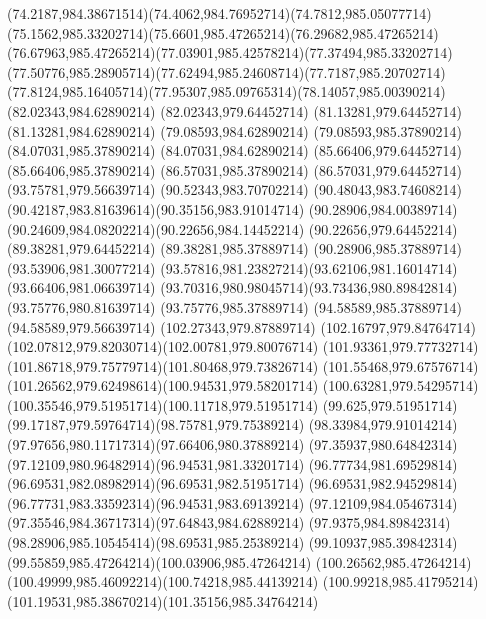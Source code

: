 {{	\curveto(74.2187,984.38671514)(74.4062,984.76952714)(74.7812,985.05077714)
	\curveto(75.1562,985.33202714)(75.6601,985.47265214)(76.29682,985.47265214)
	\curveto(76.67963,985.47265214)(77.03901,985.42578214)(77.37494,985.33202714)
	\curveto(77.50776,985.28905714)(77.62494,985.24608714)(77.7187,985.20702714)
	\curveto(77.8124,985.16405714)(77.95307,985.09765314)(78.14057,985.00390214)
	\closepath
	\moveto(82.02343,984.62890214)
	\lineto(82.02343,979.64452714)
	\lineto(81.13281,979.64452714)
	\lineto(81.13281,984.62890214)
	\lineto(79.08593,984.62890214)
	\lineto(79.08593,985.37890214)
	\lineto(84.07031,985.37890214)
	\lineto(84.07031,984.62890214)
	\closepath
	\moveto(85.66406,979.64452714)
	\lineto(85.66406,985.37890214)
	\lineto(86.57031,985.37890214)
	\lineto(86.57031,979.64452714)
	\closepath
	\moveto(93.75781,979.56639714)
	\lineto(90.52343,983.70702214)
	\curveto(90.48043,983.74608214)(90.42187,983.81639614)(90.35156,983.91014714)
	\curveto(90.28906,984.00389714)(90.24609,984.08202214)(90.22656,984.14452214)
	\lineto(90.22656,979.64452214)
	\lineto(89.38281,979.64452214)
	\lineto(89.38281,985.37889714)
	\lineto(90.28906,985.37889714)
	\lineto(93.53906,981.30077214)
	\curveto(93.57816,981.23827214)(93.62106,981.16014714)(93.66406,981.06639714)
	\curveto(93.70316,980.98045714)(93.73436,980.89842814)(93.75776,980.81639714)
	\lineto(93.75776,985.37889714)
	\lineto(94.58589,985.37889714)
	\lineto(94.58589,979.56639714)
	\closepath
	\moveto(102.27343,979.87889714)
	\curveto(102.16797,979.84764714)(102.07812,979.82030714)(102.00781,979.80076714)
	\curveto(101.93361,979.77732714)(101.86718,979.75779714)(101.80468,979.73826714)
	\curveto(101.55468,979.67576714)(101.26562,979.62498614)(100.94531,979.58201714)
	\curveto(100.63281,979.54295714)(100.35546,979.51951714)(100.11718,979.51951714)
	\curveto(99.625,979.51951714)(99.17187,979.59764714)(98.75781,979.75389214)
	\curveto(98.33984,979.91014214)(97.97656,980.11717314)(97.66406,980.37889214)
	\curveto(97.35937,980.64842314)(97.12109,980.96482914)(96.94531,981.33201714)
	\curveto(96.77734,981.69529814)(96.69531,982.08982914)(96.69531,982.51951714)
	\curveto(96.69531,982.94529814)(96.77731,983.33592314)(96.94531,983.69139214)
	\curveto(97.12109,984.05467314)(97.35546,984.36717314)(97.64843,984.62889214)
	\curveto(97.9375,984.89842314)(98.28906,985.10545414)(98.69531,985.25389214)
	\curveto(99.10937,985.39842314)(99.55859,985.47264214)(100.03906,985.47264214)
	\curveto(100.26562,985.47264214)(100.49999,985.46092214)(100.74218,985.44139214)
	\curveto(100.99218,985.41795214)(101.19531,985.38670214)(101.35156,985.34764214)
}}
